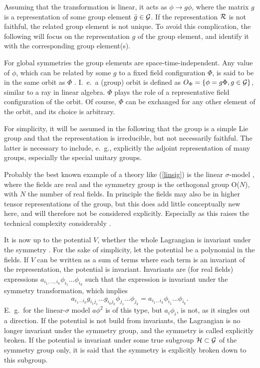 \documentclass[final,12pt,3p,longtitle]{elsarticle}
\newcommand*{\no}{\noindent}
\newcommand*{\be}{\begin{equation}}
\newcommand*{\ee}{\end{equation}}
\newcommand*{\pref}[1]{(\ref{#1})}
\newcommand*{\nn}{\nonumber}
\newcommand*{\1}{1\!\!\!\bot}
\begin{document}
Assuming that the transformation is linear, it acts as $\phi\to g\phi$, where the matrix $g$ is a representation of some group element $\bar{g}\in{\cal G}$. If the representation ${\cal R}$ is not faithful, the related group element is not unique. To avoid this complication, the following will focus on the representation $g$ of the group element, and identify it with the corresponding group element(s).

For global symmetries the group elements are space-time-independent. Any value of $\phi$, which can be related by some $g$ to a fixed field configuration $\Phi$, is said to be in the same orbit as $\Phi$ \cite{O'Raifeartaigh:1978kv}. I.\ e.\ a (group) orbit is defined as $O_\Phi=\{\phi=g\Phi,g\in{\cal G}\}$, similar to a ray in linear algebra. $\Phi$ plays the role of a representative field configuration of the orbit. Of course, $\Phi$ can be exchanged for any other element of the orbit, and its choice is arbitrary.

For simplicity, it will be assumed in the following that the group is a simple Lie group and that the representation is irreducible, but not necessarily faithful. The latter is necessary to include, e.\ g., explicitly the adjoint representation of many groups, especially the special unitary groups.

Probably the best known example of a theory like \pref{linsig} is the linear $\sigma$-model \cite{Bohm:2001yx}, where the fields are real and the symmetry group is the orthogonal group O($N$), with $N$ the number of real fields. In principle the fields may also be in higher tensor representations of the group, but this does add little conceptually new here, and will therefore not be considered explicitly. Especially as this raises the technical complexity considerably \cite{O'Raifeartaigh:1978kv}. 

It is now up to the potential $V$, whether the whole Lagrangian is invariant under the symmetry \cite{O'Raifeartaigh:1978kv,Sartori:1992ib}. For the sake of simplicity, let the potential be a polynomial in the fields. If $V$ can be written as a sum of terms where each term is an invariant of the representation, the potential is invariant. Invariants are (for real fields) expressions $a_{i_1,...,i_k}\phi_{i_1}...\phi_{i_k}$ such that the expression is invariant under the symmetry transformation, which implies
\be
a_{i_1...i_k}g_{i_1 j_1}...g_{i_kj_k}\phi_{j_1}...\phi_{j_k}=a_{i_1...i_k}\phi_{i_1}...\phi_{i_k}\nn.
\ee
\no E.\ g.\ for the linear-$\sigma$ model $a\phi^2$ is of this type, but $a_i\phi_i$, is not, as it singles out a direction. If the potential is not build from invariants, the Lagrangian is no longer invariant under the symmetry group, and the symmetry is called explicitly broken. If the potential is invariant under some true subgroup ${\cal H}\subset{\cal G}$ of the symmetry group only, it is said that the symmetry is explicitly broken down to this subgroup.
\end{document}
